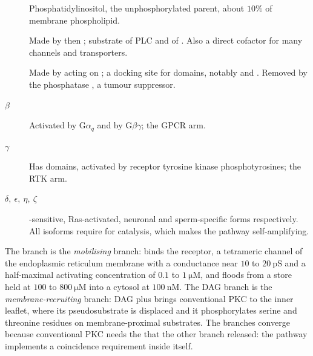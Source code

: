 \begin{defbox}[title={DEFINITIONS: the phosphoinositides and their enzymes}]
\begin{description}
\item[] Phosphatidylinositol, the unphosphorylated parent, about $10\%$ of
membrane phospholipid.
\item[] Made by  then ; substrate of PLC and of
. Also a direct cofactor for many channels and transporters.
\item[] Made by  acting on ; a docking site for
 domains, notably  and . Removed by the phosphatase
, a tumour suppressor.
\item[$\beta$] Activated by $\mathrm{G}\alpha_q$ and by
$\mathrm{G}\beta\gamma$; the GPCR arm.
\item[$\gamma$] Has  domains, activated by receptor tyrosine kinase
phosphotyrosines; the RTK arm.
\item[$\delta,\ \epsilon,\ \eta,\ \zeta$] -sensitive, Ras-activated,
neuronal and sperm-specific forms respectively. All isoforms require  for
catalysis, which makes the pathway self-amplifying.
\end{description}
\end{defbox}

\begin{thmbox}[title={PRINCIPLE: the two branches have separate jobs}]
The  branch is the \emph{mobilising} branch:  binds the 
receptor, a tetrameric  channel of the endoplasmic reticulum membrane with
a conductance near $10$ to $20\ \mathrm{pS}$ and a half-maximal activating 
concentration of $0.1$ to $1\ \mathrm{\mu M}$, and  floods from a store
held at $100$ to $800\ \mathrm{\mu M}$ into a cytosol at $100\ \mathrm{nM}$. The DAG
branch is the \emph{membrane-recruiting} branch: DAG plus  brings
conventional PKC to the inner leaflet, where its pseudosubstrate is displaced and it
phosphorylates serine and threonine residues on membrane-proximal substrates. The
branches converge because conventional PKC needs the  that the other branch
released: the pathway implements a coincidence requirement inside itself.
\end{thmbox}


